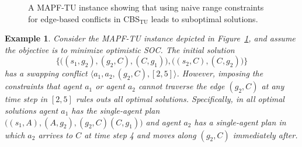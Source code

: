 \documentclass[jair,twoside,11pt,theapa]{article}
\newcommand{\tuple}[1]{\langle#1\rangle}
\newcommand{\sourcetargets}{\mathcal{S}}
\newcommand{\cbstu}{CBS$\mathrm{_{TU}}$\xspace}
\newcommand{\mapftu}{MAPF-TU\xspace}
\newtheorem{example}{Example}
\begin{document}
\begin{figure}[ht]
\centering
{}
\caption{A \mapftu instance showing that using naive range constraints for edge-based conflicts in \cbstu leads to suboptimal solutions.
}
\label{fig:no-range-conflicts-edges}
\end{figure}
\begin{example}
Consider the \mapftu instance depicted in Figure~\ref{fig:no-range-conflicts-edges}, 
and assume the objective is to minimize optimistic SOC. 
The initial solution 
\[
    \Big\{\big((s_1, g_2), (g_2, C), (C, g_1)\big),\big((s_2, C),(C, g_2)\big)\Big\}
\]
has a swapping conflict $\tuple{a_1,a_2,(g_2, C),[2,5]}$.
However, imposing the constraints that agent $a_1$ or agent $a_2$ cannot traverse the edge $(g_2, C)$ at any time step in $[2,5]$ rules outs all optimal solutions. Specifically, in all optimal solutions agent $a_1$ has the single-agent plan $\big((s_1,A), (A,g_2), (g_2, C) (C, g_1)\big)$ and agent $a_2$ has a single-agent plan in which $a_2$ arrives to $C$ at time step 4 and moves along $(g_2,C)$ immediately after. 
\end{example}


\vskip 0.2in


\end{document}
